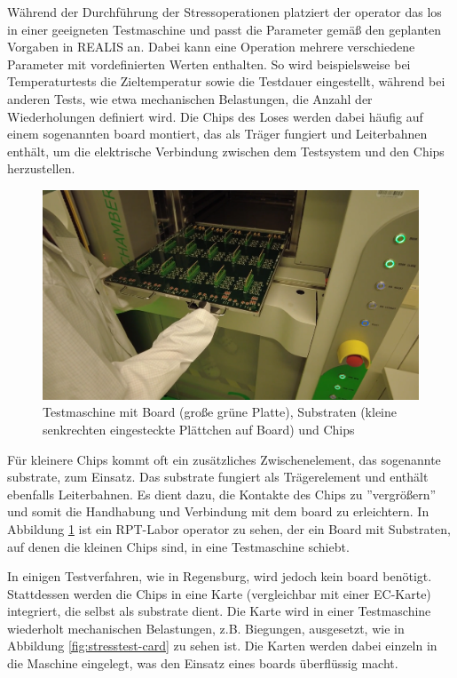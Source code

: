 Während der Durchführung der Stressoperationen platziert der \gls{operator} das \gls{los} in einer geeigneten Testmaschine und passt die Parameter gemäß den geplanten Vorgaben in \gls{REALIS} an. Dabei kann eine Operation mehrere verschiedene Parameter mit vordefinierten Werten enthalten. So wird beispielsweise bei Temperaturtests die Zieltemperatur sowie die Testdauer eingestellt, während bei anderen Tests, wie etwa mechanischen Belastungen, die Anzahl der Wiederholungen definiert wird. Die Chips des Loses werden dabei häufig auf einem sogenannten \gls{board} montiert, das als Träger fungiert und Leiterbahnen enthält, um die elektrische Verbindung zwischen dem Testsystem und den Chips herzustellen.

\begin{figure}[!htbp]
    \centering
    \includegraphics[width=1\textwidth]{bilder/testmaschine-with-board-substrate.png}
    \caption{Testmaschine mit Board (große grüne Platte), Substraten (kleine senkrechten eingesteckte Plättchen auf Board) und Chips \cite{RPTLaborIntern}}
    \label{fig:testmachine-with-board-substrate}
\end{figure}

Für kleinere Chips kommt oft ein zusätzliches Zwischenelement, das sogenannte \gls{substrate}, zum Einsatz. Das \gls{substrate} fungiert als Trägerelement und enthält ebenfalls Leiterbahnen. Es dient dazu, die Kontakte des Chips zu ''vergrößern'' und somit die Handhabung und Verbindung mit dem \gls{board} zu erleichtern.
In Abbildung \ref{fig:testmachine-with-board-substrate} ist ein \gls{RPT}-Labor \gls{operator} zu sehen, der ein Board mit Substraten, auf denen die kleinen Chips sind, in eine Testmaschine schiebt.


In einigen Testverfahren, wie in Regensburg, wird jedoch kein \gls{board} benötigt. Stattdessen werden die Chips in eine Karte (vergleichbar mit einer EC-Karte) integriert, die selbst als \gls{substrate} dient. Die Karte wird in einer Testmaschine wiederholt mechanischen Belastungen, z.B. Biegungen, ausgesetzt, wie in Abbildung \ref{fig:stresstest-card} zu sehen ist. Die Karten werden dabei einzeln in die Maschine eingelegt, was den Einsatz eines \glspl{board} überflüssig macht.

